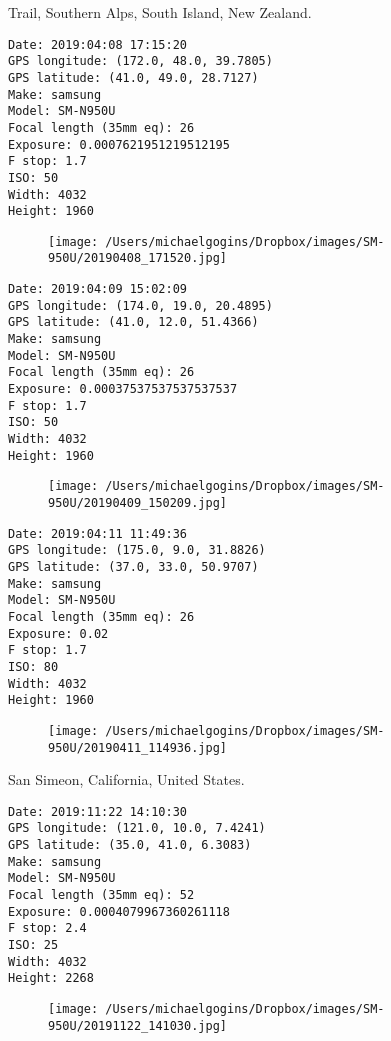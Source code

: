 \documentclass[11pt,letter,DIV=14,paper=landscape]{scrbook}
\begin{document}
\clearpage
\noindent Trail, Southern Alps, South Island, New Zealand.
\noindent
\begin{lstlisting}
Date: 2019:04:08 17:15:20
GPS longitude: (172.0, 48.0, 39.7805)
GPS latitude: (41.0, 49.0, 28.7127)
Make: samsung
Model: SM-N950U
Focal length (35mm eq): 26
Exposure: 0.0007621951219512195
F stop: 1.7
ISO: 50
Width: 4032
Height: 1960
\end{lstlisting}
\clearpage

\begin{figure}
\texttt{[image: /Users/michaelgogins/Dropbox/images/SM-950U/20190408\_171520.jpg]}
\end{figure}
    
\clearpage
\noindent 
\noindent
\begin{lstlisting}
Date: 2019:04:09 15:02:09
GPS longitude: (174.0, 19.0, 20.4895)
GPS latitude: (41.0, 12.0, 51.4366)
Make: samsung
Model: SM-N950U
Focal length (35mm eq): 26
Exposure: 0.00037537537537537537
F stop: 1.7
ISO: 50
Width: 4032
Height: 1960
\end{lstlisting}
\clearpage

\begin{figure}
\texttt{[image: /Users/michaelgogins/Dropbox/images/SM-950U/20190409\_150209.jpg]}
\end{figure}
    
\clearpage
\noindent 
\noindent
\begin{lstlisting}
Date: 2019:04:11 11:49:36
GPS longitude: (175.0, 9.0, 31.8826)
GPS latitude: (37.0, 33.0, 50.9707)
Make: samsung
Model: SM-N950U
Focal length (35mm eq): 26
Exposure: 0.02
F stop: 1.7
ISO: 80
Width: 4032
Height: 1960
\end{lstlisting}
\clearpage

\begin{figure}
\texttt{[image: /Users/michaelgogins/Dropbox/images/SM-950U/20190411\_114936.jpg]}
\end{figure}
    
\clearpage
\noindent San Simeon, California, United States.
\noindent
\begin{lstlisting}
Date: 2019:11:22 14:10:30
GPS longitude: (121.0, 10.0, 7.4241)
GPS latitude: (35.0, 41.0, 6.3083)
Make: samsung
Model: SM-N950U
Focal length (35mm eq): 52
Exposure: 0.0004079967360261118
F stop: 2.4
ISO: 25
Width: 4032
Height: 2268
\end{lstlisting}
\clearpage

\begin{figure}
\texttt{[image: /Users/michaelgogins/Dropbox/images/SM-950U/20191122\_141030.jpg]}
\end{figure}
\fi
\end{document}
